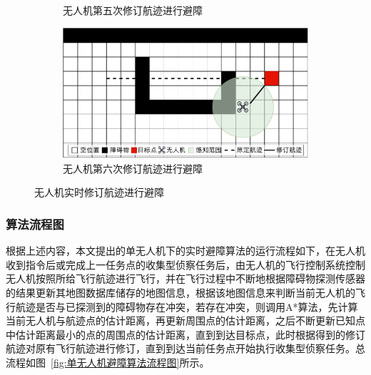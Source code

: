 \begin{figure}[!htbp]
\begin{subfigure}[t]{0.48\textwidth}
\begin{minipage}[b]{\linewidth}
            \caption{无人机第五次修订航迹进行避障}
            \label{fig:单无人机第五次修订航迹进行避障}
        \end{minipage}
    \end{subfigure}
    \begin{subfigure}[t]{0.48\textwidth}
        \captionsetup{justification=centering}
        \begin{minipage}[b]{\linewidth}
            \includegraphics[width=\textwidth]{images/单无人机避障步骤示例6.pdf}
            \caption{无人机第六次修订航迹进行避障}
            \label{fig:单无人机第六次修订航迹进行避障}
        \end{minipage}
    \end{subfigure}
    \caption{无人机实时修订航迹进行避障}
    \label{fig:单无人机实时修订航迹进行避障}
\end{figure}

\subsubsection{算法流程图}

根据上述内容，本文提出的单无人机下的实时避障算法的运行流程如下，在无人机收到指令后或完成上一任务点的收集型侦察任务后，由无人机的飞行控制系统控制无人机按照所给飞行航迹进行飞行，并在飞行过程中不断地根据障碍物探测传感器的结果更新其地图数据库储存的地图信息，根据该地图信息来判断当前无人机的飞行航迹是否与已探测到的障碍物存在冲突，若存在冲突，则调用A*算法，先计算当前无人机与航迹点的估计距离，再更新周围点的估计距离，之后不断更新已知点中估计距离最小的点的周围点的估计距离，直到到达目标点，此时根据得到的修订航迹对原有飞行航迹进行修订，直到到达当前任务点开始执行收集型侦察任务。总流程如图~\ref{fig:单无人机避障算法流程图}所示。

